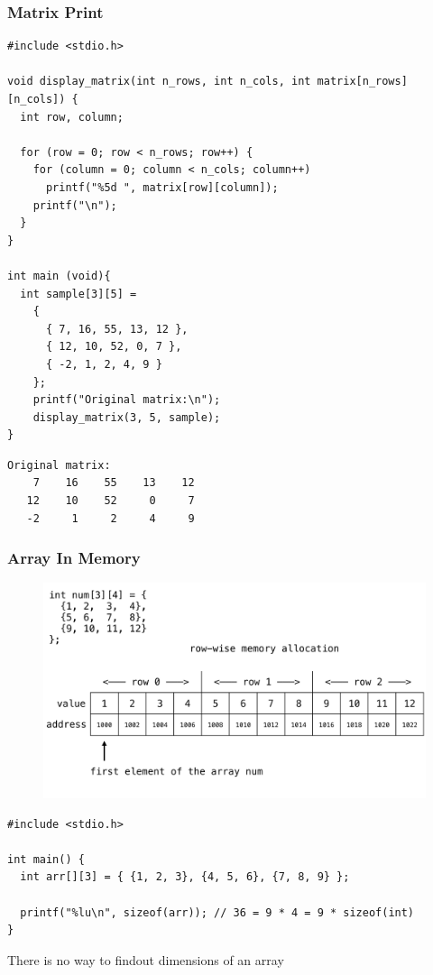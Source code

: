 \documentclass{../c-lecture}
\begin{document}
\begin{frame}[fragile]
  \frametitle{Matrix Print}
  \begin{verbatim}
#include <stdio.h>

void display_matrix(int n_rows, int n_cols, int matrix[n_rows][n_cols]) {
  int row, column;

  for (row = 0; row < n_rows; row++) {
    for (column = 0; column < n_cols; column++)
      printf("%5d ", matrix[row][column]);
    printf("\n");
  }
}

int main (void){
  int sample[3][5] =
    {
      { 7, 16, 55, 13, 12 },
      { 12, 10, 52, 0, 7 },
      { -2, 1, 2, 4, 9 }
    };
    printf("Original matrix:\n");
    display_matrix(3, 5, sample);
}
  \end{verbatim}
\end{frame}

\begin{frame}[fragile]
  \begin{verbatim}
Original matrix:
    7    16    55    13    12
   12    10    52     0     7
   -2     1     2     4     9
  \end{verbatim}
\end{frame}

\begin{frame}
  \frametitle{Array In Memory}
  \begin{figure}
    \includegraphics[width=.75\textwidth]{./img/arrays-in-memory.png}
  \end{figure}
\end{frame}

\begin{frame}[fragile]
  \begin{verbatim}
#include <stdio.h>

int main() {
  int arr[][3] = { {1, 2, 3}, {4, 5, 6}, {7, 8, 9} };

  printf("%lu\n", sizeof(arr)); // 36 = 9 * 4 = 9 * sizeof(int)
}
  \end{verbatim}
  \begin{block}{}
    There is no way to findout dimensions of an array
  \end{block}
\end{frame}
\end{document}
